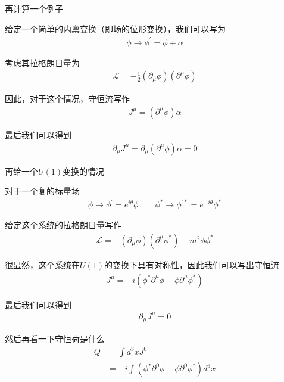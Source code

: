再计算一个例子
\begin{example}
    给定一个简单的内禀变换（即场的位形变换），我们可以写为
    \begin{align*}
        \phi\to\phi^\prime=\phi+\alpha
    \end{align*}

    考虑其拉格朗日量为
    \begin{align*}
        \mathcal{L}=-\frac{1}{2}(\partial_\mu\phi)(\partial^\mu\phi)
    \end{align*}

    因此，对于这个情况，守恒流写作
    \begin{align*}
        J^\mu=\left(\partial^\mu\phi\right)\alpha
    \end{align*}

    最后我们可以得到
    \begin{align*}
        \partial_\mu J^\mu=\partial_\mu\left(\partial^\mu\phi\right)\alpha=0
    \end{align*}
\end{example}

再给一个$U(1)$变换的情况
\begin{example}
    对于一个复的标量场
    \begin{align*}
        \phi\to\phi^\prime=e^{i\theta}\phi\quad\quad\phi^*\to\phi^{\prime*}=e^{-i\theta}\phi^*
    \end{align*}

    给定这个系统的拉格朗日量写作
    \begin{align*}
        \mathcal{L}=-(\partial_\mu\phi)(\partial^\mu\phi^*)-m^2\phi\phi^*
    \end{align*}

    很显然，这个系统在$U(1)$的变换下具有对称性，因此我们可以写出守恒流
    \begin{align*}
        J^\mu=-i\left(\phi^*\partial^\mu\phi-\phi\partial^\mu\phi^*\right)
    \end{align*}

    最后我们可以得到
    \begin{align*}
        \partial_\mu J^\mu=0
    \end{align*}

    然后再看一下守恒荷是什么
    \begin{align*}
        Q&=\int d^3x J^0\\
        &=-i\int \left(\phi^*\partial^0\phi-\phi\partial^0\phi^*\right)d^3x
    \end{align*}
\end{example}